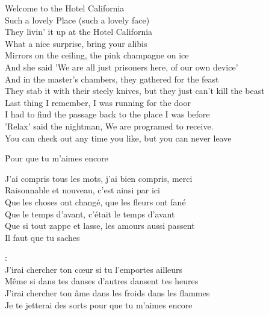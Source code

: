 \documentclass{novel}
\begin{document}
{{\begin{minipage}[b][0.55\textheight][t]{\textwidth}
\begin{multicols}{2}
Welcome to the Hotel California\\
Such a lovely Place (such a lovely face)\\
They livin' it up at the Hotel California\\
What a nice surprise, bring your alibis\\
Mirrors on the ceiling, the pink champagne on ice\\
And she said 'We are all just prisoners here, of our own device'\\
And in the master's chambers, they gathered for the feast\\
They stab it with their steely knives, but they just can't kill the beast\\
Last thing I remember, I was running for the door\\
I had to find the passage back to the place I was before\\
'Relax' said the nightman, We are programed to receive.\\
You can check out any time you like, but you can never leave\\

\end{multicols}
\end{minipage}
}
}

\newpage
\normalsize

\h*{Pour que tu m’aimes encore}

J'ai compris tous les mots, j'ai bien compris, merci\\
Raisonnable et nouveau, c'est ainsi par ici\\
Que les choses ont changé, que les fleurs ont fané\\
Que le temps d'avant, c'était le temps d'avant\\
Que si tout zappe et lasse, les amours aussi passent\\

Il faut que tu saches\\

\begin{bfseries}
[Refrain]:\\
J'irai chercher ton cœur si tu l'emportes ailleurs\\
Même si dans tes danses d'autres dansent tes heures\\
J'irai chercher ton âme dans les froids dans les flammes\\
Je te jetterai des sorts pour que tu m'aimes encore\\
\end{bfseries}
\end{document}
